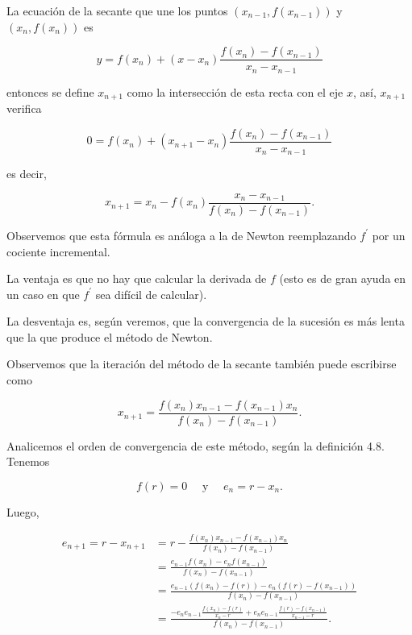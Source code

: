 \documentclass[10pt]{book}
\begin{document}
La ecuación de la secante que une los puntos $\left(x_{n-1}, f\left(x_{n-1}\right)\right)$ y $\left(x_{n}, f\left(x_{n}\right)\right)$ es

$$
y=f\left(x_{n}\right)+\left(x-x_{n}\right) \frac{f\left(x_{n}\right)-f\left(x_{n-1}\right)}{x_{n}-x_{n-1}}
$$

entonces se define $x_{n+1}$ como la intersección de esta recta con el eje $x$, así, $x_{n+1}$ verifica

$$
0=f\left(x_{n}\right)+\left(x_{n+1}-x_{n}\right) \frac{f\left(x_{n}\right)-f\left(x_{n-1}\right)}{x_{n}-x_{n-1}}
$$

es decir,

$$
x_{n+1}=x_{n}-f\left(x_{n}\right) \frac{x_{n}-x_{n-1}}{f\left(x_{n}\right)-f\left(x_{n-1}\right)} .
$$

Observemos que esta fórmula es análoga a la de Newton reemplazando $f^{\prime}$ por un cociente incremental.

La ventaja es que no hay que calcular la derivada de $f$ (esto es de gran ayuda en un caso en que $f^{\prime}$ sea difícil de calcular).

La desventaja es, según veremos, que la convergencia de la sucesión es más lenta que la que produce el método de Newton.

Observemos que la iteración del método de la secante también puede escribirse como

$$
x_{n+1}=\frac{f\left(x_{n}\right) x_{n-1}-f\left(x_{n-1}\right) x_{n}}{f\left(x_{n}\right)-f\left(x_{n-1}\right)} .
$$

Analicemos el orden de convergencia de este método, según la definición 4.8. Tenemos

$$
f(r)=0 \quad \text { y } \quad e_{n}=r-x_{n} .
$$

Luego,

$$
\begin{aligned}
e_{n+1}=r-x_{n+1} & =r-\frac{f\left(x_{n}\right) x_{n-1}-f\left(x_{n-1}\right) x_{n}}{f\left(x_{n}\right)-f\left(x_{n-1}\right)} \\
& =\frac{e_{n-1} f\left(x_{n}\right)-e_{n} f\left(x_{n-1}\right)}{f\left(x_{n}\right)-f\left(x_{n-1}\right)} \\
& =\frac{e_{n-1}\left(f\left(x_{n}\right)-f(r)\right)-e_{n}\left(f(r)-f\left(x_{n-1}\right)\right)}{f\left(x_{n}\right)-f\left(x_{n-1}\right)} \\
& =\frac{-e_{n} e_{n-1} \frac{f\left(x_{n}\right)-f(r)}{x_{n}-r}+e_{n} e_{n-1} \frac{f(r)-f\left(x_{n-1}\right)}{x_{n-1}-r}}{f\left(x_{n}\right)-f\left(x_{n-1}\right)} .
\end{aligned}
$$
\end{document}

